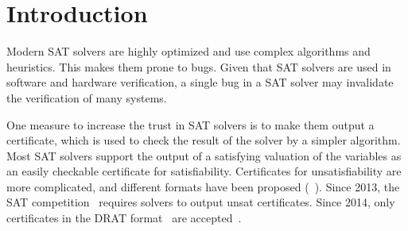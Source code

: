 \documentclass{llncs}
\begin{document}
\section{Introduction}
Modern SAT solvers are highly optimized and use complex algorithms and heuristics. This makes them prone to bugs.
Given that SAT solvers are used in software and hardware verification, a single bug in a SAT solver may 
invalidate the verification of many systems.

One measure to increase the trust in SAT solvers is to make them output a certificate, which is used to check 
the result of the solver by a simpler algorithm. 
Most SAT solvers support the output of a satisfying valuation of the variables as an easily checkable certificate for satisfiability.
Certificates for unsatisfiability are more complicated, and different formats have been proposed (\eg~\cite{SiBi06,WHH13,WHH14}).
Since 2013, the SAT competition~\cite{satcomp-2013} requires solvers to output unsat certificates.
Since 2014, only certificates in the DRAT format~\cite{WHH14} are accepted~\cite{satcomp-2014}.

\end{document}
